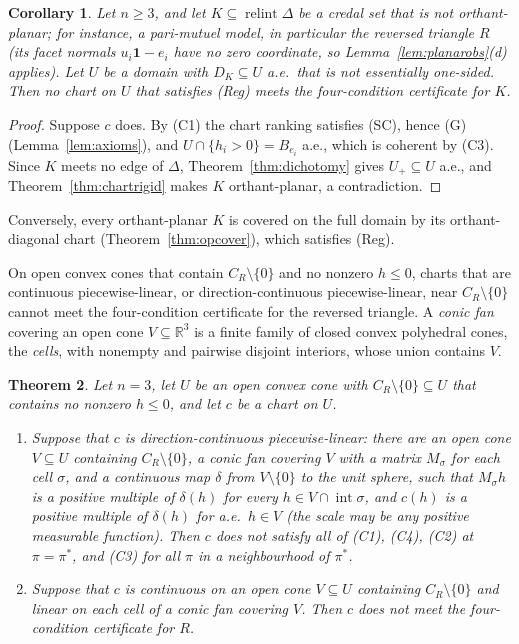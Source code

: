 \documentclass[11pt]{article}
\newcommand{\R}{\mathbb{R}}
\newcommand{\one}{\mathbf{1}}
\DeclareMathOperator{\relint}{relint}
\DeclareMathOperator{\inter}{int}
\theoremstyle{plain}
\newtheorem{theorem}{Theorem}[section]
\newtheorem{corollary}[theorem]{Corollary}
\theoremstyle{definition}
\theoremstyle{remark}
\begin{document}
\begin{corollary}\label{cor:chartrigid}
Let $n\ge3$, and let $K\subseteq\relint\Delta$ be a credal set that is not orthant-planar;
for instance, a pari-mutuel model, in particular the reversed triangle $R$ (its facet
normals $u_i\one-e_i$ have no zero coordinate, so Lemma~\ref{lem:planarobs}(d) applies).
Let $U$ be
a domain with $D_K\subseteq U$ a.e.\ that is not essentially one-sided. Then no chart on
$U$ that satisfies (Reg) meets the four-condition certificate for $K$.
\end{corollary}

\begin{proof}
Suppose $c$ does. By (C1) the chart ranking satisfies (SC), hence (G)
(Lemma~\ref{lem:axioms}), and $U\cap\{h_i>0\}=B_{e_i}$ a.e., which is coherent by (C3).
Since $K$ meets no edge of $\Delta$, Theorem~\ref{thm:dichotomy} gives $U_+\subseteq U$
a.e., and Theorem~\ref{thm:chartrigid} makes $K$ orthant-planar, a contradiction.
\end{proof}

Conversely, every orthant-planar $K$ is covered on the full domain by its orthant-diagonal
chart (Theorem~\ref{thm:opcover}), which satisfies (Reg).

On open convex cones that contain $C_R\setminus\{0\}$ and no nonzero $h\le0$, charts that
are continuous piecewise-linear, or direction-continuous piecewise-linear, near
$C_R\setminus\{0\}$ cannot meet the four-condition certificate for the reversed
triangle. A \emph{conic fan} covering an open cone $V\subseteq\R^3$ is a
finite family of closed convex polyhedral cones, the \emph{cells}, with nonempty and
pairwise disjoint interiors, whose union contains $V$.

\begin{theorem}\label{thm:PL}
Let $n=3$, let $U$ be an open convex cone with $C_R\setminus\{0\}\subseteq U$ that contains
no nonzero $h\le0$, and let $c$ be a chart on $U$.
\begin{enumerate}[label=(\alph*)]
  \item Suppose that $c$ is \emph{direction-continuous piecewise-linear}: there are an
  open cone $V\subseteq U$ containing $C_R\setminus\{0\}$, a conic fan covering $V$ with a
  matrix $M_\sigma$ for each cell $\sigma$, and a continuous map $\delta$ from $V\setminus
  \{0\}$ to the unit sphere, such that $M_\sigma h$ is a positive multiple of $\delta(h)$
  for every $h\in V\cap\inter\sigma$, and $c(h)$ is a positive multiple of $\delta(h)$ for
  a.e.\ $h\in V$ (the scale may be any positive measurable function). Then $c$ does not
  satisfy all of (C1), (C4), (C2) at $\pi=\pi^\ast$, and (C3) for all $\pi$ in a
  neighbourhood of $\pi^\ast$.
  \item Suppose that $c$ is continuous on an open cone $V\subseteq U$ containing
  $C_R\setminus\{0\}$ and linear on each cell of a conic fan covering $V$. Then $c$ does
  not meet the four-condition certificate for $R$.
\end{enumerate}
\end{theorem}
\end{document}
